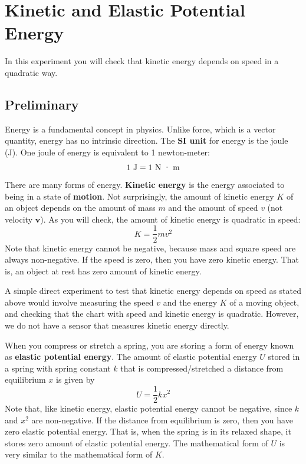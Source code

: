 \setcounter{chapter}{6}
\chapter{Kinetic and Elastic Potential Energy}
%
In this experiment you will check that kinetic energy depends on speed in a quadratic way.
%
\section{Preliminary}
%
Energy is a fundamental concept in physics. Unlike force, which is a vector quantity, energy has no intrinsic direction. The \textbf{SI unit} for energy is the joule (J). One joule of energy is equivalent to 1 newton-meter:
\begin{equation}
    1 \ \text{J} = 1 \ \text{N {\textperiodcentered} m}
\end{equation}
There are many forms of energy. \textbf{Kinetic energy} is the energy associated to being in a state of \textbf{motion}. Not surprisingly, the amount of kinetic energy $K$ of an object depends on the amount of mass $m$ and the amount of speed $v$ (not velocity $\mathbf{v}$). As you will check, the amount of kinetic energy is quadratic in speed:
\begin{equation}
    K = \frac{1}{2} m v^{2}
\end{equation}
Note that kinetic energy cannot be negative, because mass and square speed are always non-negative. If the speed is zero, then you have zero kinetic energy. That is, an object at rest has zero amount of kinetic energy.

A simple direct experiment to test that kinetic energy depends on speed as stated above would involve measuring the speed $v$ and the energy $K$ of a moving object, and checking that the chart with speed and kinetic energy is quadratic. However, we do not have a sensor that measures kinetic energy directly.

When you compress or stretch a spring, you are storing a form of energy known as \textbf{elastic potential energy}. The amount of elastic potential energy $U$ stored in a spring with spring constant $k$ that is compressed/stretched a distance from equilibrium $x$ is given by
\begin{equation}
    U = \frac{1}{2} k x^{2}
\end{equation}
Note that, like kinetic energy, elastic potential energy cannot be negative, since $k$ and $x^{2}$ are non-negative. If the distance from equilibrium is zero, then you have zero elastic potential energy. That is, when the spring is in its relaxed shape, it stores zero amount of elastic potential energy. The mathematical form of $U$ is very similar to the mathematical form of $K$.
%
